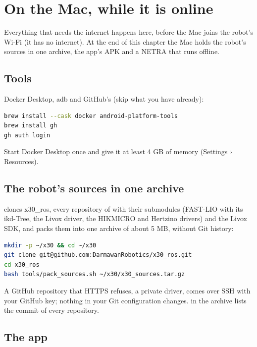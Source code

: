 \chapter{On the Mac, while it is online}
\label{ch:i-mac}

Everything that needs the internet happens here, before the Mac joins the robot's Wi-Fi (it has
no internet). At the end of this chapter the Mac holds the robot's sources in one archive, the
app's APK and a NETRA that runs offline.

\section{Tools}

Docker Desktop, adb and GitHub's  (skip what you have already):

\begin{lstlisting}[language=bash]
brew install --cask docker android-platform-tools
brew install gh
gh auth login
\end{lstlisting}

Start Docker Desktop once and give it at least 4 GB of memory (Settings › Resources).

\section{The robot's sources in one archive}
\label{sec:i-pack}

 clones x30\_ros, every repository of  with their
submodules (FAST-LIO with its ikd-Tree, the Livox driver, the HIKMICRO and Hertzino drivers) and
the Livox SDK, and packs them into one archive of about 5 MB, without Git history:

\begin{lstlisting}[language=bash]
mkdir -p ~/x30 && cd ~/x30
git clone git@github.com:DarmawanRobotics/x30_ros.git
cd x30_ros
bash tools/pack_sources.sh ~/x30/x30_sources.tar.gz
\end{lstlisting}

A GitHub repository that HTTPS refuses, a private driver, comes over SSH with your GitHub key;
nothing in your Git configuration changes.  in the archive lists the commit of every
repository.

\section{The app}

